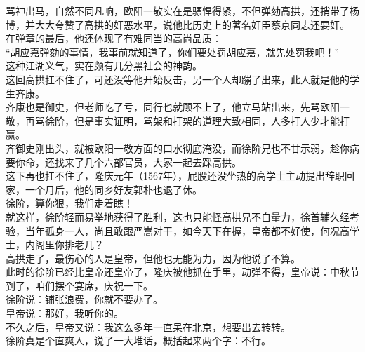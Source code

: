 \begin{multicols}{\theparacolNo}
骂神出马，自然不同凡响，欧阳一敬实在是骠悍得紧，不但弹劾高拱，还捎带了杨博，并大大夸赞了高拱的奸恶水平，说他比历史上的著名奸臣蔡京同志还要奸。\\

在弹章的最后，他还体现了有难同当的高尚品质：\\

“胡应嘉弹劾的事情，我事前就知道了，你们要处罚胡应嘉，就先处罚我吧！”\\

这种江湖义气，实在颇有几分黑社会的神韵。\\

这回高拱扛不住了，可还没等他开始反击，另一个人却蹦了出来，此人就是他的学生齐康。\\

齐康也是御史，但老师吃了亏，同行也就顾不上了，他立马站出来，先骂欧阳一敬，再骂徐阶，但是事实证明，骂架和打架的道理大致相同，人多打人少才能打赢。\\

齐御史刚出头，就被欧阳一敬方面的口水彻底淹没，而徐阶兄也不甘示弱，趁你病要你命，还找来了几个六部官员，大家一起去踩高拱。\\

这下再也扛不住了，隆庆元年（1567年），屁股还没坐热的高学士主动提出辞职回家，一个月后，他的同乡好友郭朴也退了休。\\

徐阶，算你狠，我们走着瞧！\\

就这样，徐阶轻而易举地获得了胜利，这也只能怪高拱兄不自量力，徐首辅久经考验，当年孤身一人，尚且敢跟严嵩对干，如今天下在握，皇帝都不好使，何况高学士，内阁里你排老几？\\

高拱走了，最伤心的人是皇帝，但他也无能为力，因为他说了不算。\\

此时的徐阶已经比皇帝还皇帝了，隆庆被他抓在手里，动弹不得，皇帝说：中秋节到了，咱们摆个宴席，庆祝一下。\\

徐阶说：铺张浪费，你就不要办了。\\

皇帝说：那好，我听你的。\\

不久之后，皇帝又说：我这么多年一直呆在北京，想要出去转转。\\

徐阶真是个直爽人，说了一大堆话，概括起来两个字：不行。\\


\end{multicols}
